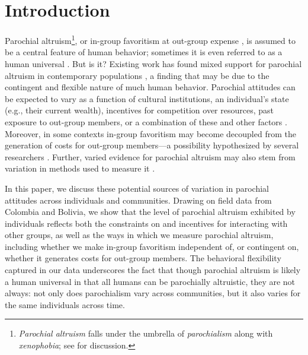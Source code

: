 \documentclass[bibauthoryear]{aa}
\begin{document}

\linenumbers
\section{Introduction}\label{firstbit}
Parochial altruism\footnote{\emph{Parochial altruism} falls under the umbrella of \emph{parochialism} along with \emph{xenophobia}; see \citet{hruschka2013economic} for discussion.}, or in-group favoritism at out-group expense \citep{choi2007coevolution}, is assumed to be a central feature of human behavior; sometimes it is even referred to as a human universal \citep{greene2013moral}. But is it? Existing work has found mixed support for parochial altruism in contemporary populations \citep{Rusch2014}, a finding that may be due to the contingent and flexible nature of much human behavior. Parochial attitudes can be expected to vary as a function of cultural institutions, an individual's state (e.g., their current wealth), incentives for competition over resources,  past exposure to out-group members, or a combination of these and other factors \citep{pisor2019evolution}. Moreover, in some contexts in-group favoritism may become decoupled from the generation of costs for out-group members---a possibility hypothesized by several researchers \citep{purzycki2019identity, hruschka2013economic, yamagishi2016parochial, brewer2006evolutionary, schaub2017threat, cashdan2001ethnocentrism}. Further, varied evidence for parochial altruism may also stem from variation in methods used to measure it \citep{Pisor2020}.


In this paper, we discuss these potential sources of variation in parochial attitudes across individuals and communities. %
Drawing on field data from Colombia and Bolivia, we show that the level of  parochial altruism  exhibited by individuals reflects both the constraints on and incentives for interacting with other groups, as well as the ways in which we measure parochial altruism, including whether we make in-group favoritism independent of, or contingent on, whether it generates costs for out-group members. The behavioral flexibility captured in our data underscores the fact that though parochial altruism is likely a human universal in that all humans can be parochially altruistic, they are not always: not only does parochialism vary across communities, but it also varies for the same individuals across time.
\end{document}

